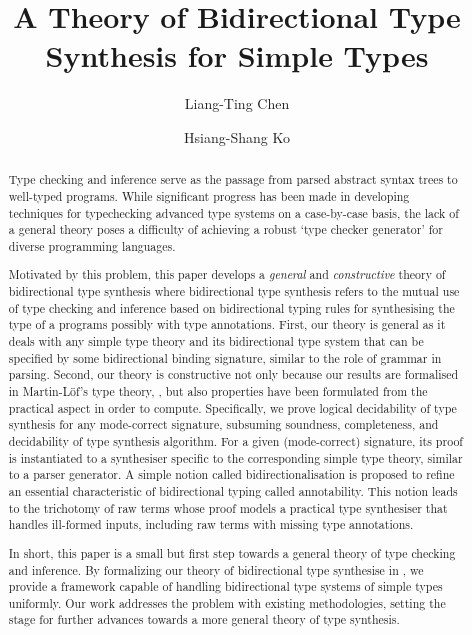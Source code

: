 \documentclass[acmsmall,screen]{acmart}
\theoremstyle{acmdefinition}
\begin{document}
\author{Liang-Ting Chen}
\author{Hsiang-Shang Ko}


\title{A Theory of Bidirectional Type Synthesis for Simple Types}

\begin{abstract}
  Type checking and inference serve as the passage from parsed abstract syntax trees to well-typed programs.
  While significant progress has been made in developing techniques for typechecking advanced type systems on a case-by-case basis, the lack of a general theory poses a difficulty of achieving a robust `type checker generator' for diverse programming languages.

  Motivated by this problem, this paper develops a \emph{general} and \emph{constructive} theory of bidirectional type synthesis where bidirectional type synthesis refers to the mutual use of type checking and inference based on bidirectional typing rules for synthesising the type of a programs possibly with type annotations.
  First, our theory is general as it deals with any simple type theory and its bidirectional type system that can be specified by some bidirectional binding signature, similar to the role of grammar in parsing.
  Second, our theory is constructive not only because our results are formalised in Martin-L\"{o}f's type theory, \Agda, but also properties have been formulated from the practical aspect in order to compute.
  Specifically, we prove logical decidability of type synthesis for any mode-correct signature, subsuming soundness, completeness, and decidability of type synthesis algorithm.
  For a given (mode-correct) signature, its proof is instantiated to a synthesiser specific to the corresponding simple type theory, similar to a parser generator.
  A simple notion called bidirectionalisation is proposed to refine an essential characteristic of bidirectional typing called annotability.
  This notion leads to the trichotomy of raw terms whose proof models a practical type synthesiser that handles ill-formed inputs, including raw terms with missing type annotations.

  In short, this paper is a small but first step towards a general theory of type checking and inference.
  By formalizing our theory of bidirectional type synthesise in \Agda, we provide a framework capable of handling bidirectional type systems of simple types uniformly.
  Our work addresses the problem with existing methodologies, setting the stage for further advances towards a more general theory of type synthesis.
\end{abstract}
\end{document}
